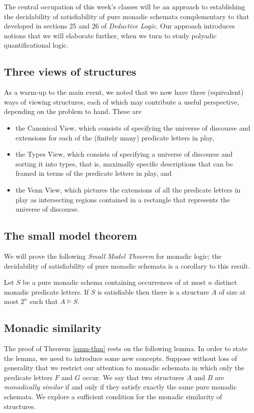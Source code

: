 The central occupation of this week's classes will be an approach to establishing the decidability of satisfiability of pure monadic schemata complementary to that developed in sections 25 and 26 of \emph{Deductive Logic}. Our approach introduces notions that we will elaborate further, when we turn to study polyadic quantificational logic.
\subsection{Three views of structures}

As a warm-up to the main event, we noted that we now have three (equivalent) ways of viewing structures, each of which may contribute a useful perspective, depending on the problem to hand. These are
\begin{itemize}
\item 
the Canonical View, which consists of specifying the universe of discourse and extensions for each of the (finitely many) predicate letters in play,
\item 
the Types View, which consists of specifying a universe of discourse and sorting it into types, that is, maximally specific descriptions that can be framed in terms of the predicate letters in play, and
\item 
the Venn View, which pictures the extensions of all the predicate letters in play as intersecting regions contained in a rectangle that represents the universe of discourse.
\end{itemize}
\subsection{The small model theorem}

We will prove the following \emph{Small Model Theorem} for monadic logic; the decidability of satisfiability of pure monadic schemata is a corollary to this result. 
\begin{theorem}\label{smm-thm}
Let $S$ be a pure monadic schema containing occurrences of at most $n$ distinct monadic predicate letters. If $S$ is satisfiable then there is a structure $A$ of size at most $2^n$ such that $A\models S$.
\end{theorem}
\subsection{Monadic similarity}

The proof of Theorem \ref{smm-thm} rests on the following lemma. In order to state the lemma, we need to introduce some new concepts. Suppose without loss of generality that we restrict our attention to monadic schemata in which only the predicate letters $F$ and $G$ occur. We say that two structures $A$ and $B$ are {\em monadically similar} if and
only if they satisfy exactly the same pure monadic schemata.
We explore a sufficient condition for the monadic similarity of structures.
